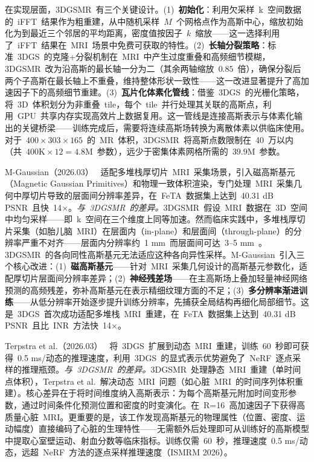 在实现层面，3DGSMR~有三个关键设计。(1)~\textbf{初始化}：利用欠采样~k~空间数据的~iFFT~结果作为粗重建，从中随机采样~$M$~个网格点作为高斯中心，缩放初始化为到最近三个邻居的平均距离，密度值按因子~$k$~缩放——这一选择利用了~iFFT~结果在~MRI~场景中免费可获取的特性。(2)~\textbf{长轴分裂策略}：标准~3DGS~的克隆+分裂机制在~MRI~中产生过度重叠和高频细节模糊，3DGSMR~改为沿高斯的最长轴一分为二（其余两轴缩放~$0.85$~倍），确保分裂后两个子高斯在最长轴上不重叠，维持整体形状一致性——这一改进显著提升了高加速因子下的高频细节重建。(3)~\textbf{瓦片化体素化管线}：借鉴~3DGS~的光栅化策略，将~3D~体积划分为非重叠~tile，每个~tile~并行处理其关联的高斯点，利用~GPU~共享内存实现高效片上数据复用。这一管线是连接高斯表示与体素化输出的关键桥梁——训练完成后，需要将连续高斯场转换为离散体素以供临床使用。对于~$400 \times 303 \times 165$~的~MR~体积，3DGSMR~将高斯点数限制在~40~万以内（共~$400\text{K} \times 12 = 4.8\text{M}$~参数），远少于密集体素网格所需的~$39.9\text{M}$~参数。

M-Gaussian（2026.03）~\cite{2603_00145} 适配多堆栈厚切片~MRI~采集场景，引入磁高斯基元（Magnetic Gaussian Primitives）和物理一致体积渲染，专门处理~MRI~采集几何中厚切片导致的层面间分辨率差异，在~FeTA~数据集上达到~40.31 dB PSNR~且快~14$\times$。\textit{与~3DGSMR~的差异。}3DGSMR~假设~MRI~数据在~3D~空间中均匀采样——即~k~空间在三个维度上同等加速。然而临床实践中，多堆栈厚切片采集（如胎儿脑~MRI）在层面内（in-plane）和层面间（through-plane）的分辨率严重不对齐——层面内分辨率约~1 mm~而层面间可达~3--5 mm~。3DGSMR~的各向同性高斯基元无法适应这种各向异性采样。M-Gaussian~引入三个核心改进：(1)~\textbf{磁高斯基元}——针对~MRI~采集几何设计的高斯基元参数化，适配厚切片层面间分辨率差异；(2)~\textbf{神经残差场}——在主高斯场上叠加轻量神经网络预测的高频残差，弥补高斯基元在表示精细纹理方面的不足；(3)~\textbf{多分辨率渐进训练}——从低分辨率开始逐步提升训练分辨率，先捕获全局结构再细化局部细节。这是~3DGS~首次成功适配多堆栈~MRI~重建，在~FeTA~数据集上达到~40.31 dB PSNR~且比~INR~方法快~14$\times$。

Terpstra et al.（2026.03）~\cite{2603_21980} 将~3DGS~扩展到动态~MRI~重建，训练~60~秒即可获得~0.5 ms/动态的推理速度，利用~3DGS~的显式表示优势避免了~NeRF~逐点采样的推理瓶颈。\textit{与~3DGSMR~的差异。}3DGSMR~处理静态~MRI~重建（单时间点体积），Terpstra et al.~解决动态~MRI~问题（如心脏~MRI~的时间序列体积重建）。核心差异在于将时间维度纳入高斯表示：为每个高斯基元附加时间变形参数，通过时间条件化预测位置和密度的时变演化。在~R=16~高加速因子下获得高质量心脏~MRI。更重要的是，该工作发现高斯基元的物理属性（位置、密度、运动幅度）直接编码了心脏的生理特性——无需额外后处理即可从训练好的高斯模型中提取心室壁运动、射血分数等临床指标。训练仅需~60~秒，推理速度~0.5 ms/动态，远超~NeRF~方法的逐点采样推理速度（ISMRM 2026）。

